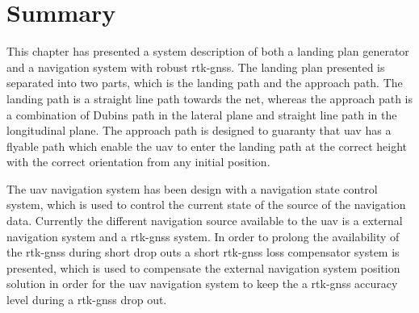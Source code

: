 \section{Summary}
This chapter has presented a system description of both a landing plan generator and a navigation system with robust \gls{rtk-gnss}. The landing plan presented is separated into two parts, which is the landing path and the approach path. The landing path is a straight line path towards the net, whereas the approach path is a combination of Dubins path in the lateral plane and straight line path in the longitudinal plane. The approach path is designed to guaranty that \gls{uav} has a flyable path which enable the \gls{uav} to enter the landing path at the correct height with the correct orientation from any initial position.

The \gls{uav} navigation system has been design with a navigation state control system, which is used to control the current state of the source of the navigation data. Currently the different navigation source available to the \gls{uav} is a external navigation system and a \gls{rtk-gnss} system. In order to prolong the availability of the \gls{rtk-gnss} during short drop outs a short \gls{rtk-gnss} loss compensator system is presented, which is used to compensate the external navigation system position solution in order for the \gls{uav} navigation system to keep the a \gls{rtk-gnss} accuracy level during a \gls{rtk-gnss} drop out.